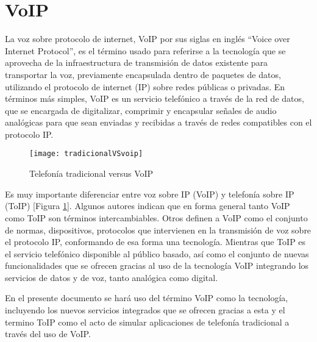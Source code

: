 	
	\section{VoIP}
	
	La voz sobre protocolo de internet, VoIP por sus siglas en 
	inglés “Voice over Internet Protocol”, es el término usado 
	para referirse a la tecnología que se aprovecha de la 
	infraestructura de transmisión de datos existente para 
	transportar la voz, previamente encapsulada dentro de paquetes 
	de datos, utilizando el protocolo de internet (IP) sobre 
	redes públicas o privadas. En términos más simples, VoIP 
	es un servicio telefónico a través de la red de datos, 
	que se encargada de digitalizar, comprimir y encapsular 
	señales de audio analógicas para que sean enviadas y recibidas 
	a través de redes compatibles con el protocolo IP.
	
	\begin{figure}[h]
		
		\texttt{[image: tradicionalVSvoip]}
		
		\caption{Telefonía tradicional versus VoIP}
		
		\centering
		
		\label{fig:ttvsv}
	\end{figure}

	Es muy importante diferenciar entre voz sobre IP (VoIP) y telefonía sobre IP 
	(ToIP) [Figura \ref{fig:ttvsv}]. Algunos autores \cite{switching} indican que 
	en forma general tanto VoIP como ToIP son términos intercambiables. Otros 
	\cite{voiptoip} definen a VoIP como el conjunto de normas, dispositivos, 
	protocolos que intervienen en la transmisión de voz sobre el protocolo IP, 
	conformando de esa forma una tecnología. Mientras que ToIP es el servicio 
	telefónico disponible al público basado, así como el conjunto de nuevas 
	funcionalidades que se ofrecen gracias al uso de la tecnología VoIP integrando 
	los servicios de datos y de voz, tanto analógica como digital. 
	
	En el presente documento se hará uso del término VoIP como la tecnología, 
	incluyendo los nuevos servicios integrados que se ofrecen gracias a esta 
	y el termino ToIP como el acto de simular aplicaciones de telefonía 
	tradicional a través del uso de VoIP.
	
